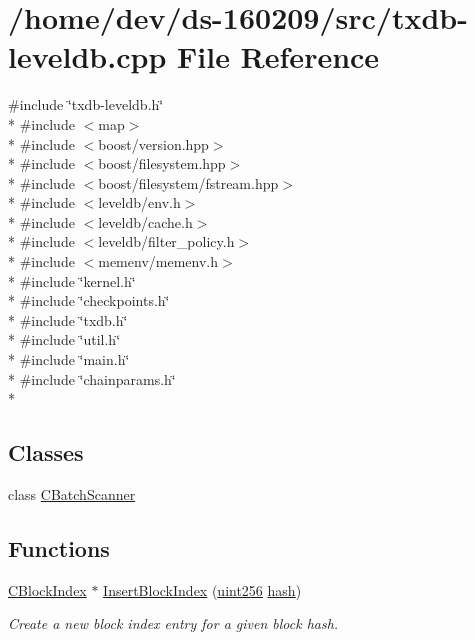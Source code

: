 \hypertarget{txdb-leveldb_8cpp}{}\section{/home/dev/ds-\/160209/src/txdb-\/leveldb.cpp File Reference}
\label{txdb-leveldb_8cpp}
{\ttfamily \#include \char`\"{}txdb-\/leveldb.\+h\char`\"{}}\\*
{\ttfamily \#include $<$map$>$}\\*
{\ttfamily \#include $<$boost/version.\+hpp$>$}\\*
{\ttfamily \#include $<$boost/filesystem.\+hpp$>$}\\*
{\ttfamily \#include $<$boost/filesystem/fstream.\+hpp$>$}\\*
{\ttfamily \#include $<$leveldb/env.\+h$>$}\\*
{\ttfamily \#include $<$leveldb/cache.\+h$>$}\\*
{\ttfamily \#include $<$leveldb/filter\+\_\+policy.\+h$>$}\\*
{\ttfamily \#include $<$memenv/memenv.\+h$>$}\\*
{\ttfamily \#include \char`\"{}kernel.\+h\char`\"{}}\\*
{\ttfamily \#include \char`\"{}checkpoints.\+h\char`\"{}}\\*
{\ttfamily \#include \char`\"{}txdb.\+h\char`\"{}}\\*
{\ttfamily \#include \char`\"{}util.\+h\char`\"{}}\\*
{\ttfamily \#include \char`\"{}main.\+h\char`\"{}}\\*
{\ttfamily \#include \char`\"{}chainparams.\+h\char`\"{}}\\*
\subsection*{Classes}
\begin{DoxyCompactItemize}
\item 
class \hyperlink{class_c_batch_scanner}{C\+Batch\+Scanner}
\end{DoxyCompactItemize}
\subsection*{Functions}
\begin{DoxyCompactItemize}
\item 
\hyperlink{class_c_block_index}{C\+Block\+Index} $\ast$ \hyperlink{txdb-leveldb_8cpp_af3adfd64a90ee443bfa5fe16321aa2d7}{Insert\+Block\+Index} (\hyperlink{classuint256}{uint256} \hyperlink{cache_8cc_a11ecb029164e055f28f4123ce3748862}{hash})
\begin{DoxyCompactList}\small\item\em Create a new block index entry for a given block hash. \end{DoxyCompactList}\end{DoxyCompactItemize}

